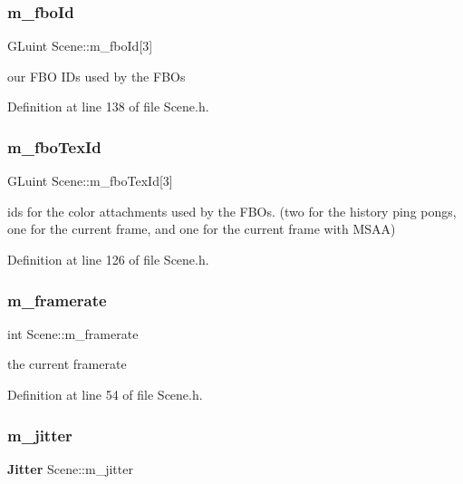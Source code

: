 \subsubsection{m\_fboId}
{\footnotesize\ttfamily G\+Luint Scene\+::m\+\_\+fbo\+Id[3]\hspace{0.3cm}{\ttfamily [private]}}



our F\+BO I\+Ds used by the F\+B\+Os 



Definition at line 138 of file Scene.\+h.

\mbox{\label{class_scene_a0eac2bf381d0a09fa6ba766c3f3ef92b}} 
\subsubsection{m\_fboTexId}
{\footnotesize\ttfamily G\+Luint Scene\+::m\+\_\+fbo\+Tex\+Id[3]\hspace{0.3cm}{\ttfamily [private]}}



ids for the color attachments used by the F\+B\+Os. (two for the history ping pongs, one for the current frame, and one for the current frame with M\+S\+AA) 



Definition at line 126 of file Scene.\+h.

\mbox{\label{class_scene_ad82be519467005242025df684e14b80a}} 
\subsubsection{m\_framerate}
{\footnotesize\ttfamily int Scene\+::m\+\_\+framerate\hspace{0.3cm}{\ttfamily [private]}}



the current framerate 



Definition at line 54 of file Scene.\+h.

\mbox{\label{class_scene_a8e05a1cb0e6364f893fe942e3d3d6b5b}} 
\subsubsection{m\_jitter}
{\footnotesize\ttfamily \textbf{ Jitter} Scene\+::m\+\_\+jitter\hspace{0.3cm}{\ttfamily [private]}}



